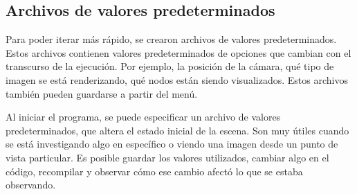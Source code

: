 \subsection{Archivos de valores predeterminados}

Para poder iterar más rápido, se crearon archivos de valores predeterminados.
Estos archivos contienen valores predeterminados de opciones que cambian con el transcurso de la ejecución.
Por ejemplo, la posición de la cámara, qué tipo de imagen se está renderizando, qué nodos están siendo visualizados.
Estos archivos también pueden guardarse a partir del menú.

Al iniciar el programa, se puede especificar un archivo de valores predeterminados, que altera el estado inicial de la escena.
Son muy útiles cuando se está investigando algo en específico o viendo una imagen desde un punto de vista particular.
Es posible guardar los valores utilizados, cambiar algo en el código, recompilar y observar cómo ese cambio afectó lo que se estaba observando.

